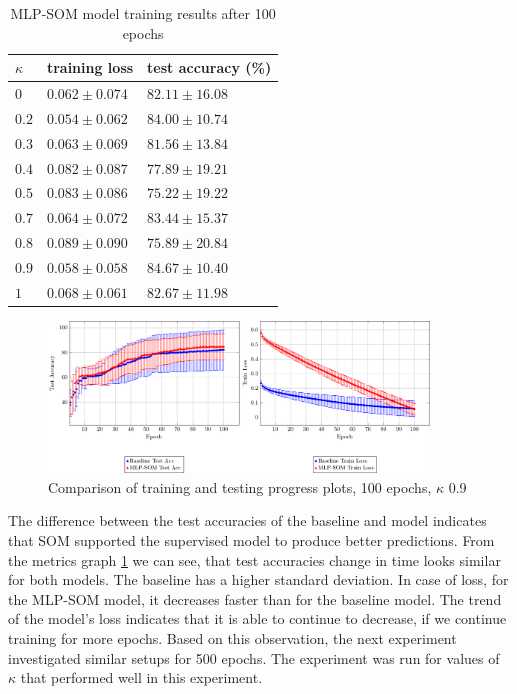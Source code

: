 \begin{table}[h!]
\centering
\begin{tabular}{|l|l|l|}
\hline
$\kappa$        & training loss & test accuracy (\%) \\ \hline
\color{purple} $0$   &  \color{purple}  $0.062	\pm 0.074 $  & \color{purple}  $82.11	\pm 16.08$  \\ \hline
$0.2$ &   $0.054	\pm 0.062 $  &  $84.00	\pm 10.74$  \\ \hline
$0.3$ &   $0.063	\pm 0.069 $  &  $81.56	\pm 13.84$  \\ \hline
$0.4$ &   $0.082	\pm 0.087 $  &  $77.89	\pm 19.21$  \\ \hline
$0.5$ &   $0.083	\pm 0.086 $  &  $75.22	\pm 19.22$  \\ \hline
$0.7$ &   $0.064	\pm 0.072 $  &  $83.44	\pm 15.37$  \\ \hline
$0.8$ &   $0.089	\pm 0.090 $  &  $75.89	\pm 20.84$  \\ \hline
\color{purple} $0.9$ &  \color{purple}  $0.058	\pm 0.058 $  & \color{purple}  $84.67	\pm 10.40$  \\ \hline
$1$   &   $0.068	\pm 0.061 $  &  $82.67	\pm 11.98$  \\ \hline
\end{tabular}
\caption{MLP-SOM model training results after 100 epochs}
\label{exp1-res-table}
\end{table}


\begin{figure}[h!]
    \centering
    \includegraphics[width=0.9\textwidth]{figs/baseline-model-tr-test-metrices-15hid-100eps-0.9k.pdf}
    \caption{Comparison of training and testing progress plots, 100 epochs, $\kappa$ 0.9}
    \label{exp1-graphs}
\end{figure}

The difference between the test accuracies of the baseline and model indicates that SOM supported the supervised model to produce better predictions. From the metrics graph \ref{exp1-graphs} we can see, that test accuracies change in time looks similar for both models. The baseline has a higher standard deviation. In case of loss, for the MLP-SOM model, it decreases faster than for the baseline model. The trend of the model's loss indicates that it is able to continue to decrease, if we continue training for more epochs. Based on this observation, the next experiment investigated similar setups for 500 epochs. The experiment was run for values of $\kappa$ that performed well in this experiment.

